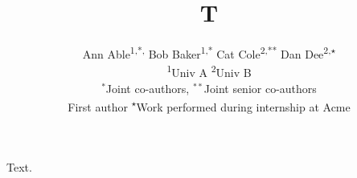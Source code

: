 \documentclass{article}
\title{T}
\author{Ann Able\textsuperscript{1,*,\dag} \quad Bob Baker\textsuperscript{1,*} \quad
Cat Cole\textsuperscript{2,**} \quad Dan Dee\textsuperscript{2,$\star$}\\
\textsuperscript{1}Univ A \quad \textsuperscript{2}Univ B\\
$^{*}$Joint co-authors, $^{**}$Joint senior co-authors\\
\textsuperscript{\dag}First author \quad \textsuperscript{$\star$}Work performed during internship at Acme}
\date{}
\begin{document}
\maketitle
Text.
\end{document}

